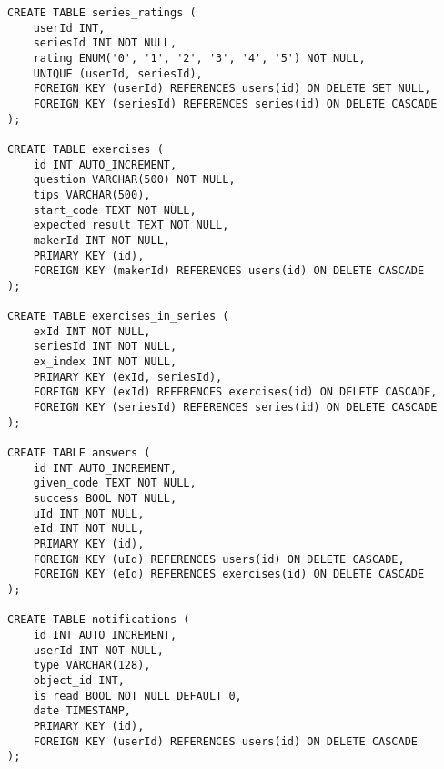 \begin{lstlisting}
CREATE TABLE series_ratings (
    userId INT,
    seriesId INT NOT NULL,
    rating ENUM('0', '1', '2', '3', '4', '5') NOT NULL,
    UNIQUE (userId, seriesId),
    FOREIGN KEY (userId) REFERENCES users(id) ON DELETE SET NULL,
    FOREIGN KEY (seriesId) REFERENCES series(id) ON DELETE CASCADE
);

CREATE TABLE exercises (
    id INT AUTO_INCREMENT,
    question VARCHAR(500) NOT NULL,
    tips VARCHAR(500),
    start_code TEXT NOT NULL,
    expected_result TEXT NOT NULL,
    makerId INT NOT NULL,
    PRIMARY KEY (id),
    FOREIGN KEY (makerId) REFERENCES users(id) ON DELETE CASCADE
);

CREATE TABLE exercises_in_series (
    exId INT NOT NULL,
    seriesId INT NOT NULL,
    ex_index INT NOT NULL,
    PRIMARY KEY (exId, seriesId),
    FOREIGN KEY (exId) REFERENCES exercises(id) ON DELETE CASCADE,
    FOREIGN KEY (seriesId) REFERENCES series(id) ON DELETE CASCADE
);

CREATE TABLE answers (
    id INT AUTO_INCREMENT,
    given_code TEXT NOT NULL,
    success BOOL NOT NULL,
    uId INT NOT NULL,
    eId INT NOT NULL,
    PRIMARY KEY (id),
    FOREIGN KEY (uId) REFERENCES users(id) ON DELETE CASCADE,
    FOREIGN KEY (eId) REFERENCES exercises(id) ON DELETE CASCADE
);

CREATE TABLE notifications (
    id INT AUTO_INCREMENT,
    userId INT NOT NULL,
    type VARCHAR(128),
    object_id INT,
    is_read BOOL NOT NULL DEFAULT 0,
    date TIMESTAMP,
    PRIMARY KEY (id),
    FOREIGN KEY (userId) REFERENCES users(id) ON DELETE CASCADE
);
\end{lstlisting}    
